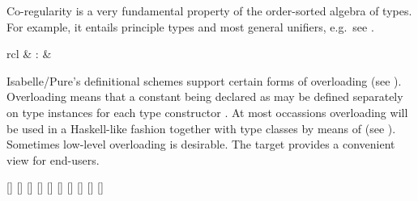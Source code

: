 \begin{isabellebody}
\begin{isamarkuptext}
  \medskip Co-regularity is a very fundamental property of the
  order-sorted algebra of types.  For example, it entails principle
  types and most general unifiers, e.g.\ see \cite{nipkow-prehofer}.%
\end{isamarkuptext}%
\isamarkuptrue%
%
\isamarkuptrue%
%
\begin{isamarkuptext}%
\begin{matharray}{rcl}
    \hypertarget{command.overloading}{\hyperlink{command.overloading}{\mbox{}}} & : &  \\
  \end{matharray}

  Isabelle/Pure's definitional schemes support certain forms of
  overloading (see ).  Overloading means that a
  constant being declared as  may be
  defined separately on type instances
  for each type constructor .  At most occassions
  overloading will be used in a Haskell-like fashion together with
  type classes by means of \hyperlink{command.instantiation}{\mbox{}} (see
  ).  Sometimes low-level overloading is desirable.
  The \hyperlink{command.overloading}{\mbox{}} target provides a convenient view for
  end-users.

  \begin{railoutput}
[]
\rail@plus
{}[]
\rail@endplus
{}[]
\rail@end
{}
[]
\rail@bar
{}[]
[]
\rail@endbar
{}[]
\rail@bar
{}
[]
[]
[]
\rail@endbar
\rail@end
\end{railoutput}



\end{isamarkuptext}
\end{isabellebody}
